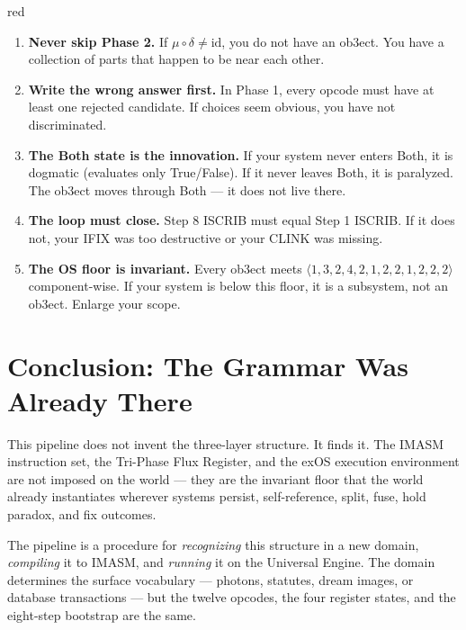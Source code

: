 \documentclass[12pt,a4paper]{article}
\begin{document}
\begin{admonitionbox}{red}
\begin{enumerate}[leftmargin=1.5em]
\item {\bf Never skip Phase 2.} If $\mu \circ \delta \neq \mathrm{id}$, you do not have
    an ob3ect. You have a collection of parts that happen to be near each other.
\item {\bf Write the wrong answer first.} In Phase 1, every opcode must have at least
    one rejected candidate. If choices seem obvious, you have not discriminated.
\item {\bf The Both state is the innovation.} If your system never enters Both, it
    is dogmatic (evaluates only True/False). If it never leaves Both, it is paralyzed.
    The ob3ect moves through Both — it does not live there.
\item {\bf The loop must close.} Step 8 ISCRIB must equal Step 1 ISCRIB. If it does
    not, your IFIX was too destructive or your CLINK was missing.
\item {\bf The OS floor is invariant.} Every ob3ect meets $\langle 1,3,2,4,2,1,2,2,1,2,2,2
    \rangle$ component-wise. If your system is below this floor, it is a subsystem,
    not an ob3ect. Enlarge your scope.
\end{enumerate}
\end{admonitionbox}

\section{Conclusion: The Grammar Was Already There}

This pipeline does not invent the three-layer structure. It finds it. The IMASM
instruction set, the Tri-Phase Flux Register, and the exOS execution environment
are not imposed on the world — they are the invariant floor that the world
already instantiates wherever systems persist, self-reference, split, fuse,
hold paradox, and fix outcomes.

The pipeline is a procedure for \emph{recognizing} this structure in a new domain,
\emph{compiling} it to IMASM, and \emph{running} it on the Universal Engine.
The domain determines the surface vocabulary — photons, statutes, dream images,
or database transactions — but the twelve opcodes, the four register states,
and the eight-step bootstrap are the same.
\end{document}

